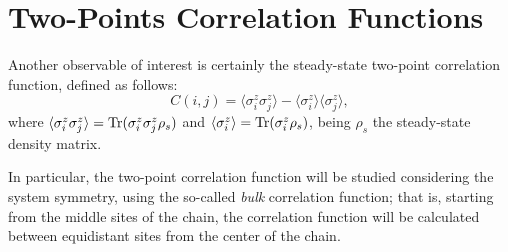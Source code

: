 \section{Two-Points Correlation Functions}
Another observable of interest is certainly the steady-state two-point correlation function, defined as follows:
\begin{equation}
    C(i, j) = \langle \sigma^z_i \sigma^z_j \rangle - \langle \sigma^z_i \rangle \langle \sigma^z_j \rangle,
\end{equation}
where $\langle \sigma^z_i \sigma^z_j \rangle = \operatorname{Tr}(\sigma^z_i \sigma^z_j \rho_{s})$ and $\langle \sigma^z_i \rangle = \operatorname{Tr}(\sigma^z_i \rho_{s})$, being $\rho_{s}$ the steady-state density matrix.

In particular, the two-point correlation function will be studied considering the system symmetry, using the so-called \emph{bulk} correlation function; that is, starting from the middle sites of the chain, the correlation function will be calculated between equidistant sites from the center of the chain. 





